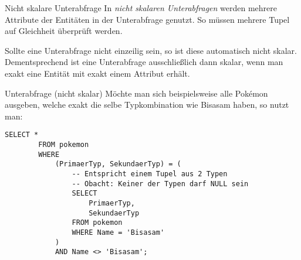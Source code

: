 \begin{defi}{Nicht skalare Unterabfrage}
    In \emph{nicht skalaren Unterabfragen} werden mehrere Attribute der Entitäten in der Unterabfrage genutzt.
    So müssen mehrere Tupel auf Gleichheit überprüft werden.

    Sollte eine Unterabfrage nicht einzeilig sein, so ist diese automatisch nicht skalar.
    Dementsprechend ist eine Unterabfrage ausschließlich dann skalar, wenn man exakt eine Entität mit exakt einem Attribut erhält.
\end{defi}

\begin{example}{Unterabfrage (nicht skalar)}
    Möchte man sich beispielsweise alle Pokémon ausgeben, welche exakt die selbe Typkombination wie Bisasam haben, so nutzt man:

    \begin{lstlisting}[language=mysql]
        SELECT *
        FROM pokemon
        WHERE
            (PrimaerTyp, SekundaerTyp) = (
                -- Entspricht einem Tupel aus 2 Typen
                -- Obacht: Keiner der Typen darf NULL sein
                SELECT
                    PrimaerTyp,
                    SekundaerTyp
                FROM pokemon
                WHERE Name = 'Bisasam'
            )
            AND Name <> 'Bisasam';
    \end{lstlisting}


\end{example}
